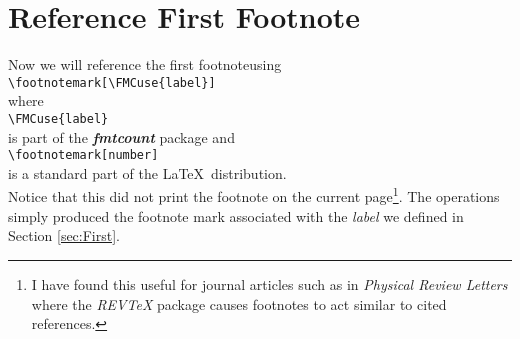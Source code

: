 \documentclass[pdftex,letterpaper,11pt]{article}
\begin{document}
\clearpage
\section{\label{sec:Reference}Reference First Footnote}

\noindent  Now we will reference the first footnote using \\

\noindent  \verb+\footnotemark[\FMCuse{label}]+ \\

\noindent  where \\

\noindent  \verb+\FMCuse{label}+ \\

\noindent  is part of the \textbf{\textit{fmtcount}} package and \\

\noindent  \verb+\footnotemark[number]+ \\

\noindent  is a standard part of the \LaTeX\ distribution.  \\

\indent  Notice that this did not print the footnote on the current page\footnote{I have found this useful for journal articles such as in \emph{Physical Review Letters} where the \emph{REVTeX} package causes footnotes to act similar to cited references.}.  The operations simply produced the footnote mark associated with the \textit{label} we defined in Section \ref{sec:First}.  

\end{document}
